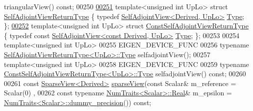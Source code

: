 \begin{DoxyCode}
      triangularView() \textcolor{keyword}{const};
00250 
\hyperlink{struct_eigen_1_1_matrix_base_1_1_self_adjoint_view_return_type}{00251}     \textcolor{keyword}{template}<\textcolor{keywordtype}{unsigned} \textcolor{keywordtype}{int} UpLo> \textcolor{keyword}{struct }\hyperlink{struct_eigen_1_1_matrix_base_1_1_self_adjoint_view_return_type}{SelfAdjointViewReturnType} \{ \textcolor{keyword}{typedef} 
      \hyperlink{group___core___module_class_eigen_1_1_self_adjoint_view}{SelfAdjointView<Derived, UpLo>} \hyperlink{group___core___module_class_eigen_1_1_self_adjoint_view}{Type}; \};
\hyperlink{struct_eigen_1_1_matrix_base_1_1_const_self_adjoint_view_return_type}{00252}     \textcolor{keyword}{template}<\textcolor{keywordtype}{unsigned} \textcolor{keywordtype}{int} UpLo> \textcolor{keyword}{struct }\hyperlink{struct_eigen_1_1_matrix_base_1_1_const_self_adjoint_view_return_type}{ConstSelfAdjointViewReturnType} \{ \textcolor{keyword}{
      typedef} \textcolor{keyword}{const} \hyperlink{group___core___module_class_eigen_1_1_self_adjoint_view}{SelfAdjointView<const Derived, UpLo>} 
      \hyperlink{group___core___module_class_eigen_1_1_self_adjoint_view}{Type}; \};
00253 
00254     \textcolor{keyword}{template}<\textcolor{keywordtype}{unsigned} \textcolor{keywordtype}{int} UpLo>
00255     EIGEN\_DEVICE\_FUNC
00256     \textcolor{keyword}{typename} \hyperlink{group___core___module_class_eigen_1_1_self_adjoint_view}{SelfAdjointViewReturnType<UpLo>::Type} selfadjointView();
00257     \textcolor{keyword}{template}<\textcolor{keywordtype}{unsigned} \textcolor{keywordtype}{int} UpLo>
00258     EIGEN\_DEVICE\_FUNC
00259     \textcolor{keyword}{typename} \hyperlink{group___core___module_class_eigen_1_1_self_adjoint_view}{ConstSelfAdjointViewReturnType<UpLo>::Type} 
      selfadjointView() \textcolor{keyword}{const};
00260 
00261     \textcolor{keyword}{const} \hyperlink{group___sparse_core___module_class_eigen_1_1_sparse_view}{SparseView<Derived>} \hyperlink{group___sparse_core___module_ga320dd291cbf4339c6118c41521b75350}{sparseView}(\textcolor{keyword}{const} Scalar& m\_reference = Scalar(0)
      ,
00262                                          \textcolor{keyword}{const} \textcolor{keyword}{typename} \hyperlink{group___core___module_struct_eigen_1_1_num_traits}{NumTraits<Scalar>::Real}& 
      m\_epsilon = \hyperlink{group___core___module_struct_eigen_1_1_num_traits}{NumTraits<Scalar>::dummy\_precision}()) \textcolor{keyword}{const};

\end{DoxyCode}
